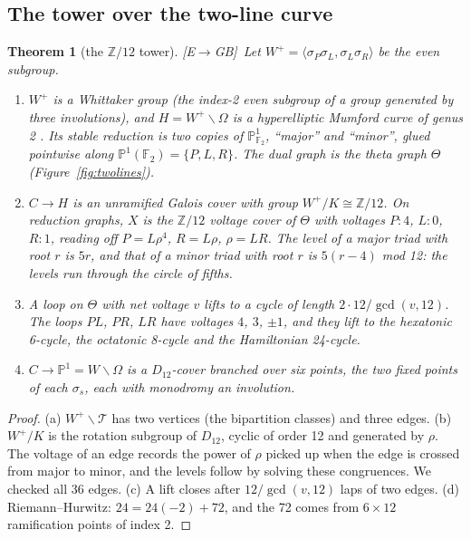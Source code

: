\documentclass[11pt]{amsart}
\numberwithin{equation}{section}
\theoremstyle{plain}
\newtheorem{theorem}{Theorem}[section]
\theoremstyle{definition}\newtheorem{definition}[theorem]{Definition}
\theoremstyle{remark}\newtheorem{remark}[theorem]{Remark}
\newcommand{\Z}{\mathbb{Z}}\newcommand{\Q}{\mathbb{Q}}\newcommand{\C}{\mathbb{C}}\newcommand{\F}{\mathbb{F}}\newcommand{\R}{\mathbb{R}}
\newcommand{\ctag}[1]{\textup{\textsf{\scriptsize[#1]}}}
\begin{document}
\subsection{The tower over the two-line curve}
\begin{theorem}[the $\Z/12$ tower]\label{thm:tower}
\ctag{E$\to$GB}\ Let $W^+=\langle\sigma_P\sigma_L,\sigma_L\sigma_R\rangle$ be the even subgroup.
\begin{enumerate}[label=(\alph*),nosep]
\item $W^+$ is a Whittaker group (the index-2 even subgroup of a group generated by three involutions), and $H=W^+\backslash\Omega$ is a hyperelliptic Mumford curve of genus 2 \cite{gvdp80}. Its stable reduction is two copies of $\mathbb P^1_{\F_2}$, ``major'' and ``minor'', glued pointwise along $\mathbb P^1(\F_2)=\{P,L,R\}$. The dual graph is the theta graph $\Theta$ (Figure~\ref{fig:twolines}).
\item $C\to H$ is an unramified Galois cover with group $W^+/K\cong\Z/12$. On reduction graphs, $X$ is the $\Z/12$ voltage cover of $\Theta$ with voltages $P:4$, $L:0$, $R:1$, reading off $P=L\rho^4$, $R=L\rho$, $\rho=LR$. The level of a major triad with root $r$ is $5r$, and that of a minor triad with root $r$ is $5(r-4)$ mod 12: the levels run through the circle of fifths.
\item A loop on $\Theta$ with net voltage $v$ lifts to a cycle of length $2\cdot12/\gcd(v,12)$. The loops $PL$, $PR$, $LR$ have voltages $4$, $3$, $\pm1$, and they lift to the hexatonic 6-cycle, the octatonic 8-cycle and the Hamiltonian 24-cycle.
\item $C\to\mathbb P^1=W\backslash\Omega$ is a $D_{12}$-cover branched over six points, the two fixed points of each $\sigma_s$, each with monodromy an involution.
\end{enumerate}
\end{theorem}
\begin{proof}
(a) $W^+\backslash\mathcal T$ has two vertices (the bipartition classes) and three edges. (b) $W^+/K$ is the rotation subgroup of $D_{12}$, cyclic of order 12 and generated by $\rho$. The voltage of an edge records the power of $\rho$ picked up when the edge is crossed from major to minor, and the levels follow by solving these congruences. We checked all 36 edges. (c) A lift closes after $12/\gcd(v,12)$ laps of two edges. (d) Riemann--Hurwitz: $24=24(-2)+72$, and the 72 comes from $6\times12$ ramification points of index 2.
\end{proof}
\end{document}
